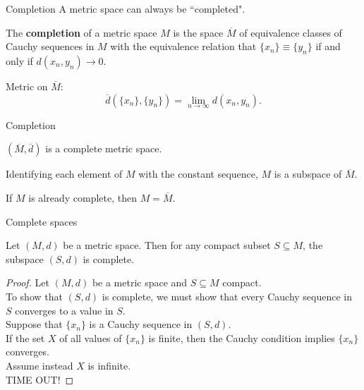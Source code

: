 \documentclass{beamer}
\begin{document}
\begin{frame}{Completion}
A metric space can always be ``completed".
\begin{defn}
\pause
The \textbf{completion} of a metric space $M$ is the space $\overline M$ of equivalence classes of Cauchy sequences in $M$ with the equivalence relation that $\{x_n\}\equiv \{y_n\}$ if and only if $d(x_n,y_n)\rightarrow 0$.
\end{defn}
\pause
Metric on $\overline M$:
\pause
$$\overline d(\{x_n\},\{y_n\}) = \lim_{n\rightarrow\infty} d(x_n,y_n).$$
\end{frame}

\begin{frame}{Completion}
\pause
  \begin{thm}
    $(\overline M,\overline d)$ is a complete metric space.
  \end{thm}
\pause
  \begin{thm}
    Identifying each element of $M$ with the constant sequence, $M$ is a subspace of $\overline M$.
  \end{thm}
\pause
  \begin{thm}
    If $M$ is already complete, then $M=\overline M$.
  \end{thm}
\end{frame}


\begin{frame}{Complete spaces}
\begin{thm}
Let $(M,d)$ be a metric space.
\pause
Then for any compact subset $S\subseteq M$, the subspace $(S,d)$ is complete.
\end{thm}
\pause
\begin{proof}
\pause
Let $(M,d)$ be a metric space and $S\subseteq M$ compact.\\
\pause
To show that $(S,d)$ is complete, we must show that every Cauchy sequence in $S$ converges to a value in $S$.\\
\pause
Suppose that $\{x_n\}$ is a Cauchy sequence in $(S,d)$.\\
\pause
If the set $X$ of all values of $\{x_n\}$ is finite, then the Cauchy condition implies $\{x_n\}$ converges.\\
\pause
Assume instead $X$ is infinite.\\
\pause
TIME OUT!
\end{proof}
\end{frame}
\end{document}

